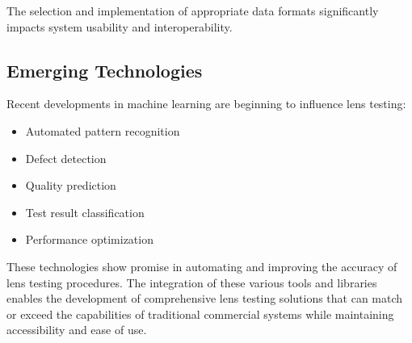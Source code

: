 The selection and implementation of appropriate data formats significantly impacts system usability and interoperability.

\subsection{Emerging Technologies}
Recent developments in machine learning are beginning to influence lens testing:
\begin{itemize}
    \item Automated pattern recognition
    \item Defect detection
    \item Quality prediction
    \item Test result classification
    \item Performance optimization
\end{itemize}

These technologies show promise in automating and improving the accuracy of lens testing procedures. The integration of these various tools and libraries enables the development of comprehensive lens testing solutions that can match or exceed the capabilities of traditional commercial systems while maintaining accessibility and ease of use.

